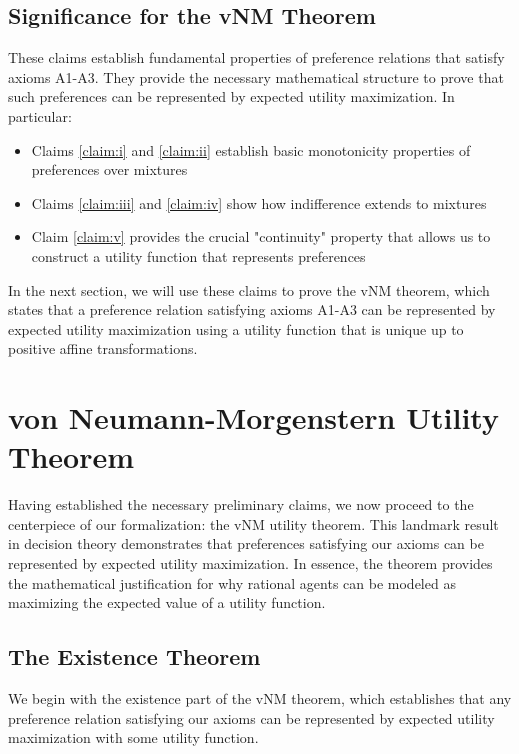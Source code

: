 \documentclass{article}
\theoremstyle{definition}
\begin{document}
\subsection{Significance for the vNM Theorem}

These claims establish fundamental properties of preference relations that satisfy axioms A1-A3. They provide the necessary mathematical structure to prove that such preferences can be represented by expected utility maximization. In particular:

\begin{itemize}
    \item Claims \ref{claim:i} and \ref{claim:ii} establish basic monotonicity properties of preferences over mixtures
    \item Claims \ref{claim:iii} and \ref{claim:iv} show how indifference extends to mixtures
    \item Claim \ref{claim:v} provides the crucial "continuity" property that allows us to construct a utility function that represents preferences
\end{itemize}

In the next section, we will use these claims to prove the vNM theorem, which states that a preference relation satisfying axioms A1-A3 can be represented by expected utility maximization using a utility function that is unique up to positive affine transformations.

\section{von Neumann-Morgenstern Utility Theorem}\label{suc: vNM utility}

Having established the necessary preliminary claims, we now proceed to the centerpiece of our formalization: the vNM utility theorem. This landmark result in decision theory demonstrates that preferences satisfying our axioms can be represented by expected utility maximization. In essence, the theorem provides the mathematical justification for why rational agents can be modeled as maximizing the expected value of a utility function.

\subsection{The Existence Theorem}

We begin with the existence part of the vNM theorem, which establishes that any preference relation satisfying our axioms can be represented by expected utility maximization with some utility function.
\end{document}
